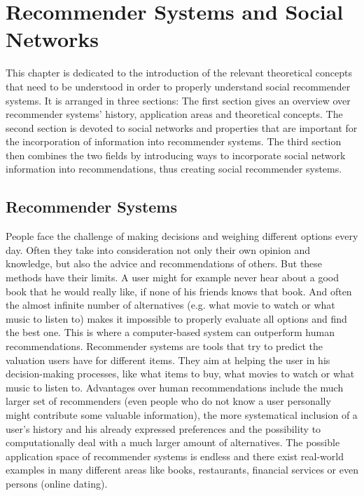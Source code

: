 \chapter{Recommender Systems and Social Networks}
\label{c:recommendersystemsandsocialnetworks} This chapter is dedicated to the introduction of the relevant theoretical concepts that need to be understood in order to properly understand social recommender systems. It is arranged in three sections: The first section gives an overview over recommender systems' history, application areas and theoretical concepts. The second section is devoted to social networks and properties that are important for the incorporation of information into recommender systems. The third section then combines the two fields by introducing ways to incorporate social network information into recommendations, thus creating social recommender systems.

\section{Recommender Systems}
\label{st:recommendersystems} People face the challenge of making decisions and weighing different options every day. Often they take into consideration not only their own opinion and knowledge, but also the advice and recommendations of others. But these methods have their limits. A user might for example never hear about a good book that he would really like, if none of his friends knows that book. And often the almost infinite number of alternatives (e.g. what movie to watch or what music to listen to) makes it impossible to properly evaluate all options and find the best one. This is where a computer-based system can outperform human recommendations. Recommender systems are tools that try to predict the valuation users have for different items. They aim at helping the user in his decision-making processes, like what items to buy, what movies to watch or what music to listen to. Advantages over human recommendations include the much larger set of recommenders (even people who do not know a user personally might contribute some valuable information), the more systematical inclusion of a user's history and his already expressed preferences and the possibility to computationally deal with a much larger amount of alternatives. The possible application space of recommender systems is endless and there exist real-world examples in many different areas like books, restaurants, financial services \cite{Felfernig_2007} or even persons (online dating).

